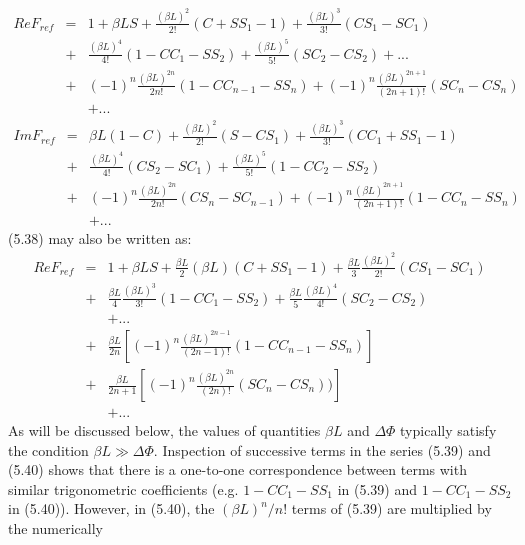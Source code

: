 \documentclass [12pt]{article}
\begin{document}
{\begin{eqnarray}
     Re F_{ref} & = & 1+\beta L S +  \frac{(\beta L)^2}{2!}(C+SS_1-1) + \frac{(\beta L)^3}{3!}(C S_1-S C_1 )
      \nonumber \\
      & + &  \frac{(\beta L)^4}{4!}(1-CC_1-SS_2) + \frac{(\beta L)^5}{5!}(SC_2-CS_2 ) + ... \nonumber \\
     & + & (-1)^{n} \frac{(\beta L)^{2n}}{2n!}(1-CC_{n-1}-SS_{n}) +(-1)^{n} \frac{(\beta L)^{2n+1}}{(2n+1)!}
       (S C_{n}-CS_{n}) \nonumber \\
     &  & + ...
 \end{eqnarray}
  \newpage
   \begin{eqnarray}
        Im F_{ref} & = & \beta L (1-C)+  \frac{(\beta L)^2}{2!}(S-C S_1) + \frac{(\beta L)^3}{3!}(CC_1+SS_1-1)
      \nonumber \\
      & + &  \frac{(\beta L)^4}{4!}(C S_2-S C_1)
        + \frac{(\beta L)^5}{5!}(1-CC_2-SS_2) \nonumber \\
       & + &   (-1)^{n}\frac{(\beta L)^{2n}}{2n!}(CS_{n}-S C_{n-1}) +(-1)^{n} \frac{(\beta L)^{2n+1}}{(2n+1)!} 
       (1-CC_{n}-SS_{n})   \nonumber \\
      &   &  + ... 
     \end{eqnarray}
     (5.38) may also be written as:
    \begin{eqnarray}
     Re F_{ref} & = & 1+\beta L S +\frac{\beta L}{2}(\beta L)(C+SS_1-1)
       + \frac{\beta L}{3}\frac{(\beta L)^2}{2!}(C S_1-S C_1)
      \nonumber \\
      & + &  \frac{\beta L}{4} \frac{(\beta L)^3}{3!}(1-CC_1-SS_2)
       + \frac{\beta L}{5} \frac{(\beta L)^4}{4!}(S C_2- CS_2) \nonumber \\
       &   & +... \nonumber \\
       & + & \frac{\beta L}{2n}\left[(-1)^{n} \frac{(\beta L)^{2n-1}}{(2n-1)!} 
       (1-CC_{n-1}-SS_{n})\right] \nonumber \\
       & + & \frac{\beta L}{2n+1}\left[(-1)^{n} \frac{(\beta L)^{2n}}{(2n)!}
       (S C_{n}-CS_{n}))\right]\nonumber \\
       &   &  + ... 
     \end{eqnarray}  
     As will be discussed below, the values of quantities $\beta L$ and $\Delta \Phi$ typically 
     satisfy the condition $\beta L \gg \Delta \Phi$. Inspection of successive terms in the series
   (5.39) and (5.40) shows that there is a one-to-one correspondence between terms with
    similar trigonometric coefficients (e.g. $1-CC_1-SS_1$ in (5.39) and $1-CC_1-SS_2$ in
     (5.40)). However, in (5.40), the $(\beta L)^n/n!$ terms of (5.39) are multiplied by the numerically
}
\end{document}

